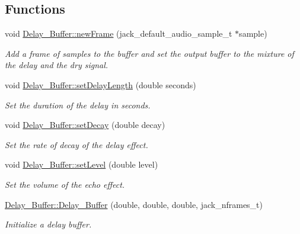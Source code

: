\subsection*{Functions}
\begin{DoxyCompactItemize}
\item 
void \hyperlink{group__delay_ga5d9be4601c4309b6ff4de2dc286f4da4}{Delay\+\_\+\+Buffer\+::new\+Frame} (jack\+\_\+default\+\_\+audio\+\_\+sample\+\_\+t $\ast$sample)
\begin{DoxyCompactList}\small\item\em Add a frame of samples to the buffer and set the output buffer to the mixture of the delay and the dry signal. \end{DoxyCompactList}\item 
void \hyperlink{group__delay_ga3e9ddb2b97fffe52c0713c26d89aae65}{Delay\+\_\+\+Buffer\+::set\+Delay\+Length} (double seconds)
\begin{DoxyCompactList}\small\item\em Set the duration of the delay in seconds. \end{DoxyCompactList}\item 
void \hyperlink{group__delay_ga07267d6e8a0f31681e45f755b83245a7}{Delay\+\_\+\+Buffer\+::set\+Decay} (double decay)
\begin{DoxyCompactList}\small\item\em Set the rate of decay of the delay effect. \end{DoxyCompactList}\item 
void \hyperlink{group__delay_ga52bd5fcb9ec627cf7da1ad3ecfc8bb87}{Delay\+\_\+\+Buffer\+::set\+Level} (double level)
\begin{DoxyCompactList}\small\item\em Set the volume of the echo effect. \end{DoxyCompactList}\item 
\hyperlink{group__delay_ga54225f6e4c9f3bde732baa1d824261fc}{Delay\+\_\+\+Buffer\+::\+Delay\+\_\+\+Buffer} (double, double, double, jack\+\_\+nframes\+\_\+t)
\begin{DoxyCompactList}\small\item\em Initialize a delay buffer. \end{DoxyCompactList}\end{DoxyCompactItemize}
